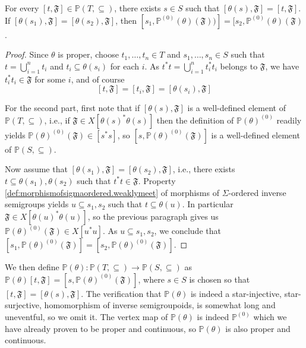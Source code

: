 \begin{lemma}
    For every $[t,\mathfrak{F}]\in\mathbb{P}(T,\subseteq)$, there exists $s\in S$ such that $[\theta(s),\mathfrak{F}]=[t,\mathfrak{F}]$. If $[\theta(s_1),\mathfrak{F}]=[\theta(s_2),\mathfrak{F}]$, then $[s_1,\mathbb{P}^{(0)}(\theta)(\mathfrak{F}))]=[s_2,\mathbb{P}^{(0)}(\theta)(\mathfrak{F})$.
\end{lemma}
\begin{proof}
    Since $\theta$ is proper, choose $t_1,\ldots,t_n\in T$ and $s_1,\ldots,s_n\in S$ such that $t=\bigcup_{i=1}^n t_i$ and $t_i\subseteq \theta(s_i)$ for each $i$. As $t^*t=\bigcup_{i=1}^n t_i^*t_i$ belongs to $\mathfrak{F}$, we have $t_i^*t_i\in\mathfrak{F}$ for some $i$, and of course
    \[[t,\mathfrak{F}]=[t_i,\mathfrak{F}]=[\theta(s_i),\mathfrak{F}]\]
    
    For the second part, first note that if $[\theta(s),\mathfrak{F}]$ is a well-defined element of $\mathbb{P}(T,\subseteq)$, i.e., if $\mathfrak{F}\in X[\theta(s)^*\theta(s)]$ then the definition of $\mathbb{P}(\theta)^{(0)}$ readily yields $\mathbb{P}(\theta)^{(0)}(\mathfrak{F})\in[s^*s]$, so $[s,\mathbb{P}(\theta)^{(0)}(\mathfrak{F})]$ is a well-defined element of $\mathbb{P}(S,\subseteq)$.
    
    Now assume that $[\theta(s_1),\mathfrak{F}]=[\theta(s_2),\mathfrak{F}]$, i.e., there exists $t\subseteq\theta(s_1),\theta(s_2)$ such that $t^*t\in\mathfrak{F}$. Property \ref{def:morphismofsigmaordered.weaklymeet} of morphisms of $\Sigma$-ordered inverse semigroups yields $u\subseteq s_1,s_2$ such that $t\subseteq\theta(u)$. In particular $\mathfrak{F}\in X[\theta(u)^*\theta(u)]$, so the previous paragraph gives us $\mathbb{P}(\theta)^{(0)}(\mathfrak{F})\in X[u^*u]$. As $u\subseteq s_1,s_2$, we conclude that $[s_1,\mathbb{P}(\theta)^{(0)}(\mathfrak{F})]=[s_2,\mathbb{P}(\theta)^{(0)}(\mathfrak{F})]$.\qedhere
\end{proof}

We then define $\mathbb{P}(\theta)\colon\mathbb{P}(T,\subseteq)\to\mathbb{P}(S,\subseteq)$ as $\mathbb{P}(\theta)[t,\mathfrak{F}]=[s,\mathbb{P}(\theta)^{(0)}(\mathfrak{F})]$, where $s\in S$ is chosen so that $[t,\mathfrak{F}]=[\theta(s),\mathfrak{F}]$. The verification that $\mathbb{P}(\theta)$ is indeed a star-injective, star-surjective, homomorphism of inverse semigroupoids, is somewhat long and uneventful, so we omit it. The vertex map of $\mathbb{P}(\theta)$ is indeed $\mathbb{P}^{(0)}$ which we have already proven to be proper and continuous, so $\mathbb{P}(\theta)$ is also proper and continuous.

